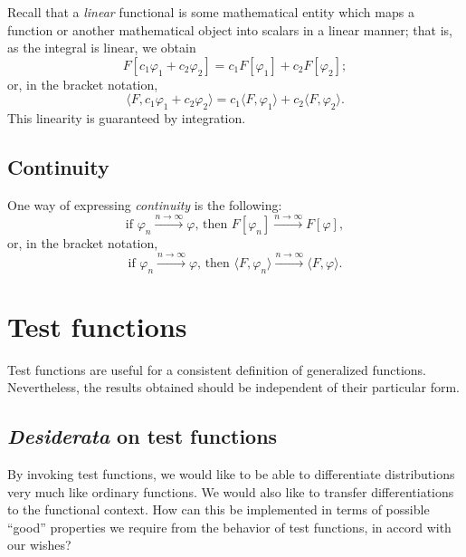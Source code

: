 Recall that a {\em linear} functional is some mathematical entity which maps a function or another mathematical object
into scalars in a linear manner; that is, as the integral is linear, we obtain
\begin{equation}
F[c_1\varphi_1+c_2\varphi_2 ]=
c_1F[\varphi_1]  +
c_2F[\varphi_2];
\end{equation}
or, in the bracket notation,
\begin{equation}
\langle F ,   c_1\varphi_1+c_2\varphi_2 \rangle  =
c_1 \langle F ,  \varphi_1   \rangle  +
c_2 \langle F ,   \varphi_2   \rangle .
\end{equation}
This linearity is guaranteed by integration.

\subsection{Continuity}

One way of expressing {\em continuity} is
 the following:
\begin{equation}
\textrm{if }
\varphi_n \stackrel{n\rightarrow \infty}{\longrightarrow} \varphi
\textrm{, then }
F[\varphi_n ] \stackrel{n\rightarrow \infty}{\longrightarrow} F[\varphi  ],
\end{equation}
or, in the bracket notation,
\begin{equation}
\textrm{if }
\varphi_n \stackrel{n\rightarrow \infty}{\longrightarrow} \varphi
\textrm{, then }
\langle F ,    \varphi_n  \rangle \stackrel{n\rightarrow \infty}{\longrightarrow} \langle F ,    \varphi   \rangle .
\end{equation}


\section{Test functions}

Test functions are useful for a consistent definition of generalized functions.
Nevertheless, the results obtained should be independent of their particular form.

\subsection{{\it Desiderata} on test functions}

By invoking test functions, we would like to be able to differentiate distributions very much like ordinary functions.
We would also like to transfer differentiations to the functional context.
How can this be implemented in terms of possible ``good'' properties we require from the behavior of test functions, in accord with our wishes?

